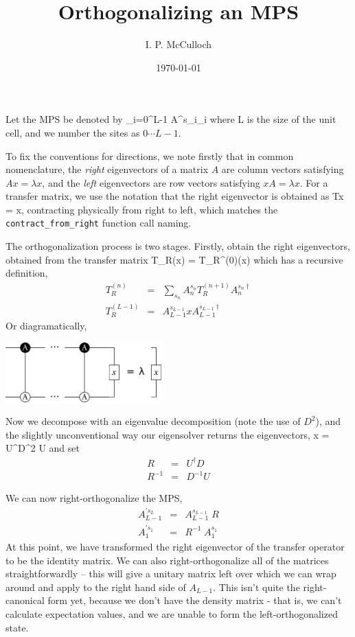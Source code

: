 \documentclass{article}[10pt]
\title{Orthogonalizing an MPS}
\author{I. P. McCulloch}
\date{\today}
\begin{document}
\maketitle

Let the MPS be denoted by
\beq
\prod_{i=0}^{L-1} A^{s_i}_{i}
\eeq
where L is the size of the unit cell, and we number the sites as $0 \cdots L-1$.

To fix the conventions for directions, we note firstly that 
in common nomenclature, the \emph{right} eigenvectors of a matrix $A$ are column vectors satisfying
$Ax = \lambda x$, and the \emph{left} eigenvectors are row vectors satisfying $x A = \lambda x$.
For a transfer matrix, we use the notation that the right eigenvector is obtained as Tx = x, contracting
physically from right to left, which matches the \texttt{contract\_from\_right} function call naming.

The orthogonalization process is two stages.  Firstly, obtain the right eigenvectors, 
obtained from the transfer
matrix
\beq
T_R(x) = T_R^{(0)}(x)
\eeq
which has a recursive definition,
\begin{eqnarray}
T_R^{(n)} &=& \sum_{s_n}  A^{s_n}_n T_R^{(n+1)} A^{s_n\dagger}_n \\
T_R^{(L-1)} &=&  A^{s_{L-1}}_{L-1} x A^{s_{L-1}\dagger}_{L-1}
\end{eqnarray}
Or diagramatically,

\begin{centering}
\includegraphics[width=6cm]{TransferRight.pdf}\par
\end{centering}

Now we decompose with an eigenvalue decomposition (note the use of $D^2$),
and the slightly unconventional way our eigensolver returns the eigenvectors,
\beq
x = U^\dagger D^2 U
\eeq
and set
\begin{eqnarray}
R &=& U^\dagger D \\
R^{-1} &=& D^{-1} U
\end{eqnarray}

We can now right-orthogonalize the MPS,
\begin{eqnarray}
A^{'s_L}_{L-1} &=& A^{s_{L-1}}_{L-1} \; R \\
A^{'s_1}_1 &=& R^{-1} \; A^{s_1}_1
\end{eqnarray}
At this point, we have transformed the right eigenvector
of the transfer operator to be the identity matrix. We can also right-orthogonalize all of the matrices
straightforwardly -- this will give a unitary matrix left over which we can wrap around and apply
to the right hand side of $A_{L-1}$. This isn't quite the right-canonical form yet, because
we don't have the density matrix - that is, we can't calculate expectation values, and we are
unable to form the left-orthogonalized state.
\end{document}
